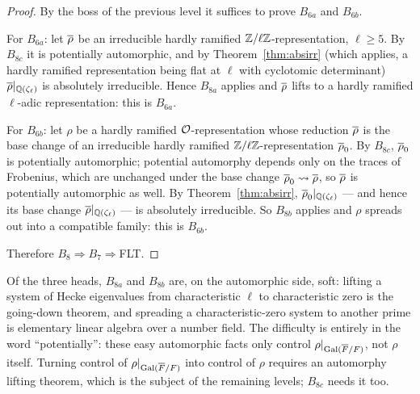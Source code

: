 \documentclass[11pt]{article}
\begin{document}
\begin{proof}
By the boss of the previous level it suffices to prove $B_{6a}$ and $B_{6b}$.

For $B_{6a}$: let $\overline{\rho}$ be an irreducible hardly ramified
$\mathbb{Z}/\ell\mathbb{Z}$-representation, $\ell\geq5$. By $B_{8c}$ it is potentially
automorphic, and by Theorem~\ref{thm:absirr} (which applies, a hardly ramified
representation being flat at $\ell$ with cyclotomic determinant)
$\overline{\rho}|_{\mathbb{Q}(\zeta_\ell)}$ is absolutely irreducible. Hence $B_{8a}$ applies
and $\overline{\rho}$ lifts to a hardly ramified $\ell$-adic representation: this is
$B_{6a}$.

For $B_{6b}$: let $\rho$ be a hardly ramified $\mathcal{O}$-representation whose
reduction $\overline{\rho}$ is the base change of an irreducible hardly ramified
$\mathbb{Z}/\ell\mathbb{Z}$-representation $\overline{\rho}_0$. By $B_{8c}$, $\overline{\rho}_0$ is potentially
automorphic; potential automorphy depends only on the traces of Frobenius,
which are unchanged under the base change $\overline{\rho}_0\rightsquigarrow\overline{\rho}$, so
$\overline{\rho}$ is potentially automorphic as well. By Theorem~\ref{thm:absirr},
$\overline{\rho}_0|_{\mathbb{Q}(\zeta_\ell)}$ --- and hence its base change
$\overline{\rho}|_{\mathbb{Q}(\zeta_\ell)}$ --- is absolutely irreducible. So $B_{8b}$ applies
and $\rho$ spreads out into a compatible family: this is $B_{6b}$.

Therefore $B_8\Rightarrow B_7\Rightarrow{}$FLT.
\end{proof}

\begin{remark}
Of the three heads, $B_{8a}$ and $B_{8b}$ are, on the automorphic side, soft:
lifting a system of Hecke eigenvalues from characteristic $\ell$ to
characteristic zero is the going-down theorem, and spreading a
characteristic-zero system to another prime is elementary linear algebra over a
number field. The difficulty is entirely in the word ``potentially'': these
easy automorphic facts only control $\rho|_{\operatorname{Gal}(\overline{F}/F)}$, not $\rho$ itself. Turning
control of $\rho|_{\operatorname{Gal}(\overline{F}/F)}$ into control of $\rho$ requires an automorphy lifting
theorem, which is the subject of the remaining levels; $B_{8c}$ needs it too.
\end{remark}
\end{document}
